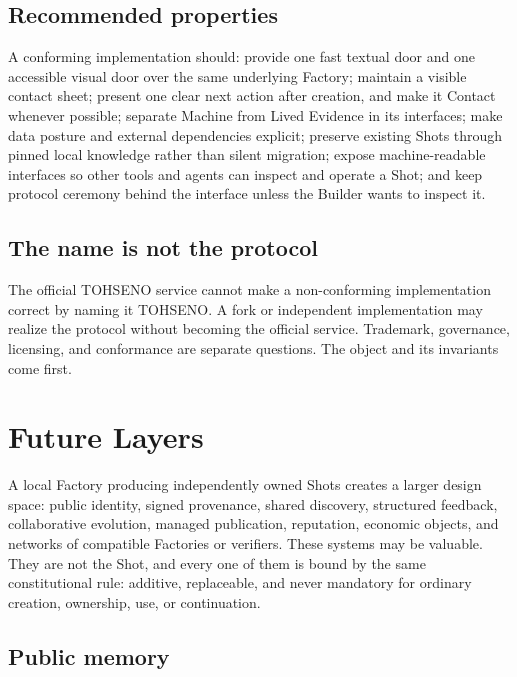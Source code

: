 \documentclass[11pt]{article}
\newcommand{\TOH}{TOHSENO}
\begin{document}
\subsection{Recommended properties}

A conforming implementation should: provide one fast textual door and
one accessible visual door over the same underlying Factory; maintain a
visible contact sheet; present one clear next action after creation, and
make it Contact whenever possible; separate Machine from Lived Evidence
in its interfaces; make data posture and external dependencies explicit;
preserve existing Shots through pinned local knowledge rather than
silent migration; expose machine-readable interfaces so other tools and
agents can inspect and operate a Shot; and keep protocol ceremony behind
the interface unless the Builder wants to inspect it.

\subsection{The name is not the protocol}

The official \TOH{} service cannot make a non-conforming implementation
correct by naming it \TOH{}. A fork or independent implementation may
realize the protocol without becoming the official service. Trademark,
governance, licensing, and conformance are separate questions. The
object and its invariants come first.

\section{Future Layers}

A local Factory producing independently owned Shots creates a larger
design space: public identity, signed provenance, shared discovery,
structured feedback, collaborative evolution, managed publication,
reputation, economic objects, and networks of compatible Factories or
verifiers. These systems may be valuable. They are not the Shot, and
every one of them is bound by the same constitutional rule: additive,
replaceable, and never mandatory for ordinary creation, ownership, use,
or continuation.

\subsection{Public memory}
\end{document}
